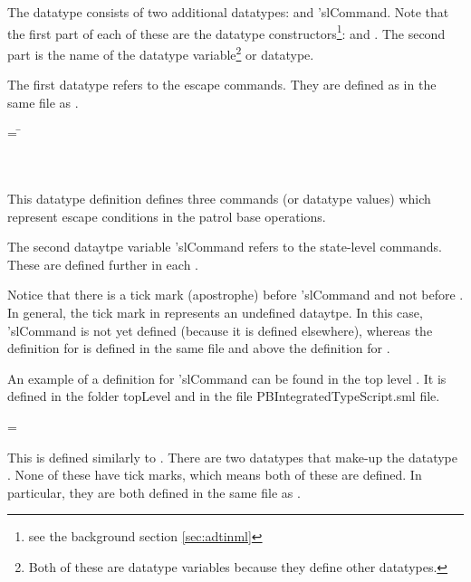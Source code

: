\documentclass[../../main/main.tex]{subfiles}
\begin{document}
The  datatype consists of two additional datatypes:   and  'slCommand.  Note that the first part of each of these are the datatype constructors\footnote{see the background section \ref{sec:adtinml}}:  and .  The second part is the name of the datatype variable\footnote{Both of these are datatype variables because they define other datatypes.} or datatype.  

The first datatype refers to the escape commands.  They are defined as  in the same file as .

 \begin{tabbing}
  = \=  \\
 						\>\HOLTokenBar{}  \\
						\>\HOLTokenBar{} \\
           					\>\HOLTokenBar{} 
\end{tabbing}

This datatype definition defines three commands (or datatype values) which represent escape conditions in the patrol base operations.  

The second dataytpe variable 'slCommand refers to the state-level commands.  These are defined further in each .  

Notice that there is a tick mark (apostrophe) before 'slCommand and not before .  In general, the tick mark in  represents an undefined dataytpe.  In this case, 'slCommand is not yet defined (because it is defined elsewhere), whereas the definition for  is defined in the same file and above the definition for .   

An example of a definition for 'slCommand can be found in the top level .  It is defined in the folder topLevel and in the file PBIntegratedTypeScript.sml file.

 =   \HOLTokenBar{}  

This is defined similarly to .  There are two datatypes that make-up the datatype .  None of these have tick marks, which means both of these are defined.  In particular, they are both defined in the same file as .
\end{document}

